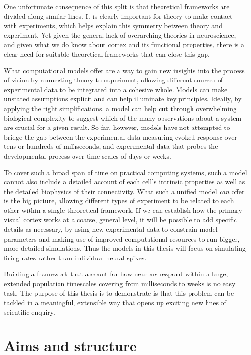 \documentclass[phd,ianc,twoside]{infthesis}
\begin{document}
One unfortunate consequence of this split is that theoretical frameworks
are divided along similar lines. It is clearly important for theory to make
contact with experiments, which helps explain this symmetry between theory
and experiment. Yet given the general lack of overarching theories in
neuroscience, and given what we do know about cortex and its functional
properties, there is a clear need for suitable theoretical frameworks
that can close this gap.

What computational models offer are a way to gain new insights into the
process of vision by connecting theory to experiment, allowing
different sources of experimental data to be integrated into a cohesive
whole. Models can make unstated assumptions explicit and can help
illuminate key principles.  Ideally, by applying the right
simplifications, a model can help cut through overwhelming biological
complexity to suggest which of the many observations about a system are
crucial for a given result.  So far, however, models have not
attempted to bridge the gap between the experimental data measuring
evoked response over tens or hundreds of milliseconds, and
experimental data that probes the developmental process over time
scales of days or weeks.

To cover such a broad span of time on practical computing systems,
such a model cannot also include a detailed account of each cell's intrinsic
properties as well as the detailed biophysics of their
connectivity. What such a unified model \emph{can} offer is the big picture,
allowing different types of experiment to be related to each other
within a single theoretical framework. If we can establish how the
primary visual cortex works at a coarse, general level, it will be
possible to add specific details as necessary, by using new experimental
data to constrain model parameters and making use of improved
computational resources to run bigger, more detailed simulations.
Thus the models in this thesis will focus on simulating firing rates
rather than individual neural spikes.

Building a framework that account for how neurons respond within a
large, extended population timescales covering from milliseconds to
weeks is no easy task. The purpose of this thesis is to demonstrate is
that this problem can be tackled in a meaningful, extensible way that
opens up exciting new lines of scientific enquiry.

\section{Aims and structure}
\label{section:Aims}
\end{document}
